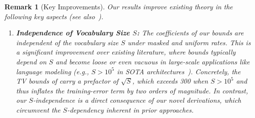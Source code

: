 \documentclass{article} %
\newtheorem{remark}[theorem]{Remark}
\begin{document}
\begin{remark}[Key Improvements]\label{rmk:key_improve} Our results improve existing theory in the following key aspects (see also~). 
\begin{enumerate}
    \item \label{rmk:S_free_key} \textbf{Independence of Vocabulary Size $S$:} The coefficients of our bounds are independent of the vocabulary size $S$ under masked and uniform rates. This is a significant improvement over existing literature, where bounds typically depend on $S$ and become loose or even vacuous in large-scale applications like language modeling (e.g., $S > 10^5$ in SOTA architectures~\citep{nie2026large}). Concretely, the TV bounds of \citet{liang2026sharp,liang2026convergence} carry a prefactor of $\sqrt{S}$, which exceeds 300 when $S > 10^5$ and thus inflates the training-error term by two orders of magnitude. In contrast, our $S$-independence is a direct consequence of our novel derivations, which circumvent the $S$-dependency inherent in prior approaches.
    

\end{enumerate}
\end{remark}
\end{document}
